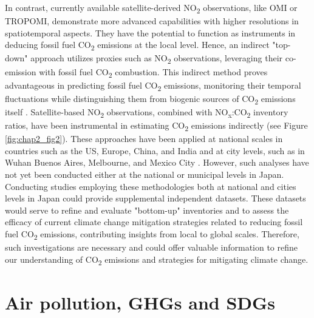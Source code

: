 In contrast, currently available satellite-derived NO\textsubscript{2} observations, like OMI or TROPOMI, demonstrate more advanced capabilities with higher resolutions in spatiotemporal aspects. They have the potential to function as instruments in deducing fossil fuel CO\textsubscript{2} emissions at the local level. Hence, an indirect "top-down" approach utilizes proxies such as NO\textsubscript{2} observations, leveraging their co-emission with fossil fuel CO\textsubscript{2} combustion. This indirect method proves advantageous in predicting fossil fuel CO\textsubscript{2} emissions, monitoring their temporal fluctuations while distinguishing them from biogenic sources of CO\textsubscript{2} emissions itself \citep{ciais2014current, goldberg2019exploiting}. Satellite-based NO\textsubscript{2} observations, combined with NO\textsubscript{x}:CO\textsubscript{2} inventory ratios, have been instrumental in estimating CO\textsubscript{2} emissions indirectly (see Figure \ref{fig:chap2_fig2}). These approaches have been applied at national scales in countries such as the US, Europe, China, and India \citep{konovalov2016estimation, zheng2020satellite, miyazaki2023predictability} and at city levels, such as in Wuhan \citep{zhang2023quantifying} Buenos Aires, Melbourne, and Mexico City \citep{yang2023using}. However, such analyses have not yet been conducted either at the national or municipal levels in Japan. Conducting studies employing these methodologies both at national and cities levels in Japan could provide supplemental independent datasets. These datasets would serve to refine and evaluate "bottom-up" inventories and to assess the efficacy of current climate change mitigation strategies related to reducing fossil fuel CO\textsubscript{2} emissions, contributing insights from local to global scales. Therefore, such investigations are necessary and could offer valuable information to refine our understanding of CO\textsubscript{2} emissions and strategies for mitigating climate change. \par

\section{Air pollution, GHGs and SDGs}
